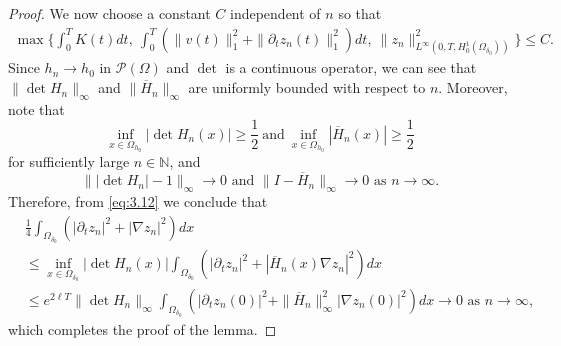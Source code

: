 \documentclass[10pt,a4paper]{amsart}
\begin{document}
\begin{proof}
We now choose a constant $C$ independent of $n$ so that 
\begin{align*}
\max \big\{ \int_0^TK(t)dt,~\int_0^T\left(\|v(t)\|_1^2+\|\partial_t z_n(t)\|^2_1\right)dt,~ \|z_n \|^2_{L^{\infty}(0, T, H^1_0(\Omega_{\delta_0}))}\big\} \le C.
\end{align*}
Since $h_n \to h_0$ in $\mathcal{P}(\Omega)$ and $\det$ is a continuous operator, we can see that  $\|\det H_n\|_{\infty}$  and  $\|\overline{H}_n\|_{\infty} $ are uniformly bounded with respect to $n$. Moreover, note that 
$$
\inf\limits_{x \in \Omega_{h_0}}|\det H_n(x)| \ge \frac12 ~\mbox{and}~\inf\limits_{x \in \Omega_{h_0}} |\overline{H}_n(x)| \ge \frac12
$$ for sufficiently large $n \in \mathbb N$, and 
\begin{equation*}
\||\det H_n |-1\|_{\infty}\to 0\mbox{ and }   \|I-\overline{H}_n\|_{\infty}\to 0 \mbox{ as } n\to \infty.
\end{equation*}
Therefore,  from \eqref{eq:3.12} we conclude that
\begin{align*}
    &\frac{1}{4}\int_{\Omega_{\delta_0}}\left(\left|\partial_t z_n\right|^2 +|\nabla z_n|^2\right)dx\\
    &\leq \inf_{x\in \Omega_{\delta_0}}|\det H_n(x)|
    \int_{\Omega_{\delta_0}}\left(\left|\partial_t z_n\right|^2 +|\overline{H}_n(x)\nabla z_n|^2\right)dx\\
    &\leq e^{2\ell T} \|\det H_n\|_{\infty}\int_{\Omega_{\delta_0}}\left(\left|\partial_t z_n(0)\right|^2 +\|\overline{H}_n\|^2_\infty|\nabla z_n(0)|^2\right)dx \to 0 \mbox{ as } n\to \infty,
\end{align*}
which completes the proof of the lemma.
\end{proof}
\end{document}
